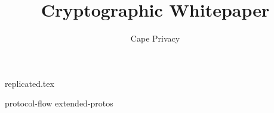 \documentclass{article}
\begin{document}
%
\newcommand{\mainsection}[1]{\newpage \section{#1}}
\newcommand{\msubsection}[1]{\newpage \subsection{#1}}
\newcommand{\msubsubsection}[1]{\subsubsection{#1}}

\title{Cryptographic Whitepaper}
\author{Cape Privacy}


\maketitle
\tableofcontents

\thispagestyle{fancy}




{replicated.tex}


\newpage
%



\clearpage
\appendix


{protocol-flow}
{extended-protos}
\end{document}
